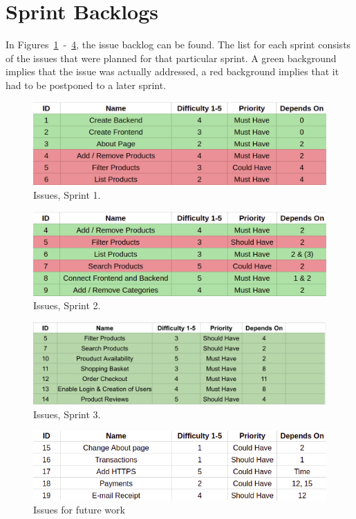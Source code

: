 \newpage

\section{Sprint Backlogs}\label{sec:backlog}

In Figures~\ref{fig:sprint_1}~-~\ref{fig:sprint_4}, the issue backlog can
be found. The list for each sprint consists of the issues that were planned
for that particular sprint. A green background implies that the issue was
actually addressed, a red background implies that it had to be postponed to
a later sprint.

\begin{figure}[H]
\centering
\includegraphics[width=\textwidth]{third_sprint/sprint_1.png}
\caption{\label{fig:sprint_1} Issues, Sprint 1.}
\end{figure}

\begin{figure}[H]
\centering
\includegraphics[width=\textwidth]{third_sprint/sprint_2.png}
\caption{\label{fig:sprint_2} Issues, Sprint 2.}
\end{figure}

\begin{figure}[H]
\centering
\includegraphics[width=\textwidth]{third_sprint/sprint_3_2.png}
\caption{\label{fig:sprint_3} Issues, Sprint 3.}
\end{figure}

\begin{figure}[H]
\centering
\includegraphics[width=\textwidth]{third_sprint/other.png}
\caption{\label{fig:sprint_4} Issues for future work}
\end{figure}
